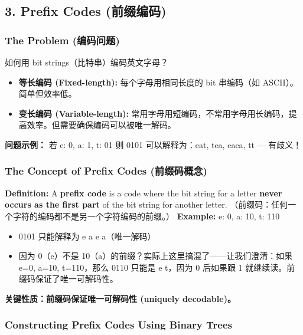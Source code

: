 \documentclass[10pt,a4paper,openany]{ctexbook}
\theoremstyle{definition}
\theoremstyle{remark}
\renewenvironment{quote}
  {\list{}{\leftmargin=1em\rightmargin=0pt\topsep=0.5pt\partopsep=0pt}\item[]}
  {\endlist}
\begin{document}
\subsection{3. Prefix Codes (前缀编码)}

\subsubsection{The Problem (编码问题)}

如何用 bit strings（比特串）编码英文字母？
\begin{itemize}
\item \textbf{等长编码 (Fixed-length):} 每个字母用相同长度的 bit 串编码（如 ASCII）。简单但效率低。
\item \textbf{变长编码 (Variable-length):} 常用字母用短编码，不常用字母用长编码，提高效率。但需要确保编码可以被唯一解码。

\end{itemize}

\textbf{问题示例：} 若 e: 0, a: 1, t: 01
则 0101 可以解释为：eat, tea, eaea, tt — 有歧义！
\subsubsection{The Concept of Prefix Codes (前缀码概念)}

\textbf{Definition:} A \textbf{prefix code} is a code where the bit string for a letter \textbf{never occurs as the first part} of the bit string for another letter.
（前缀码：任何一个字符的编码都不是另一个字符编码的前缀。）
\textbf{Example:} e: 0, a: 10, t: 110
\begin{itemize}
\item 0101 只能解释为 e a e a（唯一解码）
\item 因为 0（e）不是 10（a）的前缀？实际上这里搞混了——让我们澄清：如果 e=0, a=10, t=110，那么 0110 只能是 e t，因为 0 后如果跟 1 就继续读。前缀码保证了唯一可解码性。

\end{itemize}

\begin{quote}
\textbf{关键性质：前缀码保证唯一可解码性 (uniquely decodable)。}

\end{quote}

\subsubsection{Constructing Prefix Codes Using Binary Trees}
\end{document}
